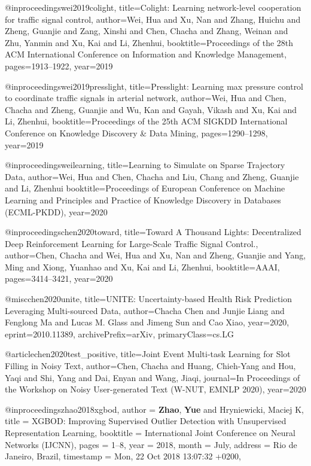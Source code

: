 @inproceedings{wei2019colight,
  title={Colight: Learning network-level cooperation for traffic signal control},
  author={Wei, Hua and Xu, Nan and Zhang, Huichu and Zheng, Guanjie and Zang, Xinshi and Chen, Chacha and Zhang, Weinan and Zhu, Yanmin and Xu, Kai and Li, Zhenhui},
  booktitle={Proceedings of the 28th ACM International Conference on Information and Knowledge Management},
  pages={1913--1922},
  year={2019}
}

@inproceedings{wei2019presslight,
  title={Presslight: Learning max pressure control to coordinate traffic signals in arterial network},
  author={Wei, Hua and Chen, Chacha and Zheng, Guanjie and Wu, Kan and Gayah, Vikash and Xu, Kai and Li, Zhenhui},
  booktitle={Proceedings of the 25th ACM SIGKDD International Conference on Knowledge Discovery \& Data Mining},
  pages={1290--1298},
  year={2019}
}

@inproceedings{weilearning,
  title={Learning to Simulate on Sparse Trajectory Data},
  author={Wei, Hua and Chen, Chacha and Liu, Chang and Zheng, Guanjie and Li, Zhenhui}
  booktitle={Proceedings of European Conference on Machine Learning and Principles and Practice of Knowledge Discovery in Databases (ECML-PKDD)},
  year={2020}
}

@inproceedings{chen2020toward,
  title={Toward A Thousand Lights: Decentralized Deep Reinforcement Learning for Large-Scale Traffic Signal Control.},
  author={Chen, Chacha and Wei, Hua and Xu, Nan and Zheng, Guanjie and Yang, Ming and Xiong, Yuanhao and Xu, Kai and Li, Zhenhui},
  booktitle={AAAI},
  pages={3414--3421},
  year={2020}
}


@misc{chen2020unite,
      title={UNITE: Uncertainty-based Health Risk Prediction Leveraging Multi-sourced Data}, 
      author={Chacha Chen and Junjie Liang and Fenglong Ma and Lucas M. Glass and Jimeng Sun and Cao Xiao},
      year={2020},
      eprint={2010.11389},
      archivePrefix={arXiv},
      primaryClass={cs.LG}
}



@article{chen2020test_positive,
  title={Joint Event Multi-task Learning for Slot Filling in Noisy Text},
  author={Chen, Chacha and Huang, Chieh-Yang and Hou, Yaqi and Shi, Yang and Dai, Enyan and Wang, Jiaqi},
  journal={In Proceedings of the Workshop on Noisy User-generated Text (W-NUT, EMNLP 2020)},
  year={2020}
}




@inproceedings{zhao2018xgbod,
    author    = {\textbf{Zhao}, \textbf{Yue} and Hryniewicki, Maciej K},
    title     = {{XGBOD:} Improving Supervised Outlier Detection with Unsupervised
               Representation Learning},
    booktitle = {International Joint Conference on Neural Networks ({IJCNN})},
    pages     = {1--8},
    year      = {2018},
    month     = {July},
    address   = {Rio de Janeiro, Brazil},
    timestamp = {Mon, 22 Oct 2018 13:07:32 +0200},
}

